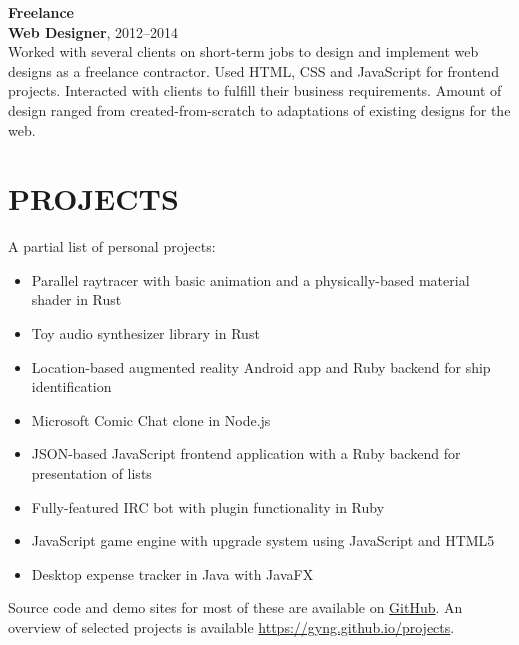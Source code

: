 \documentclass[line, margin]{res}
\begin{document}
\begin{resume}
        \textbf{Freelance} \\
        \textbf{Web Designer}, 2012--2014 \\
        Worked with several clients on short-term jobs to design and implement web designs as a freelance contractor. Used HTML, CSS and JavaScript for frontend projects. Interacted with clients to fulfill their business requirements. Amount of design ranged from created-from-scratch to adaptations of existing designs for the web.


    \section{PROJECTS}
        A partial list of personal projects: \\
        \begin{itemize}[leftmargin=*]
        \item Parallel raytracer with basic animation and a physically-based material shader in Rust
        \item Toy audio synthesizer library in Rust
        \item Location-based augmented reality Android app and Ruby backend for ship identification
        \item Microsoft Comic Chat clone in Node.js
        \item \textsc{JSON}-based JavaScript frontend application with a Ruby backend for presentation of lists
        \item \textsc Fully-featured IRC bot with plugin functionality in Ruby
        \item JavaScript game engine with upgrade system using JavaScript and HTML5
        \item Desktop expense tracker in Java with JavaFX
        \end{itemize}

        Source code and demo sites for most of these are available on \href{http://github.com/gyng}{GitHub}. An overview of selected projects is available \href{https://gyng.github.io/projects}{https://gyng.github.io/projects}.

\end{resume}
\end{document}
